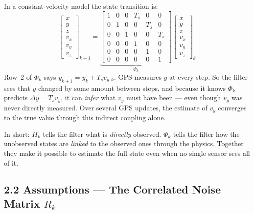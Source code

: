 \documentclass[12pt, a4paper]{article}
\begin{document}
\begin{notebox}
  In a constant-velocity model the state transition is:
  \[
    \begin{bmatrix} x \\ y \\ z \\ v_x \\ v_y \\ v_z \end{bmatrix}_{k+1}
    =
    \underbrace{\begin{bmatrix}
      1 & 0 & 0 & T_s & 0   & 0   \\
      0 & 1 & 0 & 0   & T_s & 0   \\
      0 & 0 & 1 & 0   & 0   & T_s \\
      0 & 0 & 0 & 1   & 0   & 0   \\
      0 & 0 & 0 & 0   & 1   & 0   \\
      0 & 0 & 0 & 0   & 0   & 1
    \end{bmatrix}}_{\Phi_k}
    \begin{bmatrix} x \\ y \\ z \\ v_x \\ v_y \\ v_z \end{bmatrix}_{k}
  \]
  Row~2 of $\Phi_k$ says $y_{k+1} = y_k + T_s v_{y,k}$.
  GPS measures $y$ at every step.
  So the filter sees that $y$ changed by some amount between steps, and because
  it knows $\Phi_k$ predicts $\Delta y = T_s v_y$, it can \emph{infer} what
  $v_y$ must have been --- even though $v_y$ was never directly measured.
  Over several GPS updates, the estimate of $v_y$ converges to the true value
  through this indirect coupling alone.

  In short: $H_k$ tells the filter what is \emph{directly} observed.
  $\Phi_k$ tells the filter how the unobserved states are \emph{linked} to
  the observed ones through the physics.
  Together they make it possible to estimate the full state even when no single
  sensor sees all of it.
\end{notebox}

\subsection*{2.2 \quad Assumptions --- The Correlated Noise Matrix $R_k$}
\end{document}
